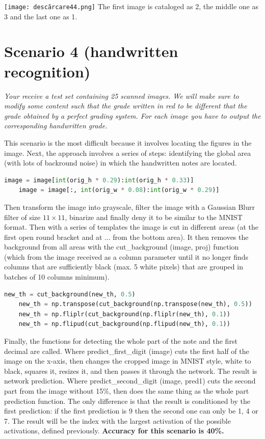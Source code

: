 \documentclass[12pt]{article}
\begin{document}
\texttt{[image: descărcare44.png]}
The first image is cataloged as 2, the middle one as 3 and the last one as 1.

\section*{Scenario 4 (handwritten recognition)}

\emph{Your receive a test set containing 25 scanned images. We will make sure to modify 
some content such that the grade written in red to be different that the grade obtained 
by a perfect grading system. For each image you have to output the corresponding handwritten grade.}

This scenario is the most difficult because it involves locating the figures in the image. 
Next, the approach involves a series of steps: identifying the global area (with lots of 
backround noise) in which the handwritten notes are located.
\begin{lstlisting}[language=Python]
    image = image[int(orig_h * 0.29):int(orig_h * 0.33)]
    image = image[:, int(orig_w * 0.08):int(orig_w * 0.29)]
\end{lstlisting}
Then transform the image into grayscale, filter the image with a Gaussian Blurr filter of 
size $11\times11$, binarize and finally deny it to be similar to the MNIST format. Then with a 
series of templates the image is cut in different areas (at the first open round bracket and 
at ... from the bottom area). It then removes the background from all areas with the 
cut\_background (image, proj) function (which from the image received as a column parameter 
until it no longer finds columns that are sufficiently black (max. 5 white pixels) that are 
grouped in batches of 10 columns minimum).
\begin{lstlisting}[language=Python]
    new_th = cut_background(new_th, 0.5)
    new_th = np.transpose(cut_background(np.transpose(new_th), 0.5))
    new_th = np.fliplr(cut_background(np.fliplr(new_th), 0.1))
    new_th = np.flipud(cut_background(np.flipud(new_th), 0.1))
\end{lstlisting}
\par

Finally, the functions for detecting the whole part of the note and the first decimal are 
called. Where predict\_first\_digit (image) cuts the first half of the image on the x-axis, 
then changes the cropped image in MNIST style, white to black, squares it, resizes it, and 
then passes it through the network. The result is network prediction.
Where predict\_second\_digit (image, pred1) cuts the second part from the image without 15\%, 
then does the same thing as the whole part prediction function. The only difference is that 
the result is conditioned by the first prediction: if the first prediction is 9 then the 
second one can only be 1, 4 or 7. The result will be the index with the largest activation 
of the possible activations, defined previously. \textbf{Accuracy for this scenario is 40\%.}
\par
\end{document}
